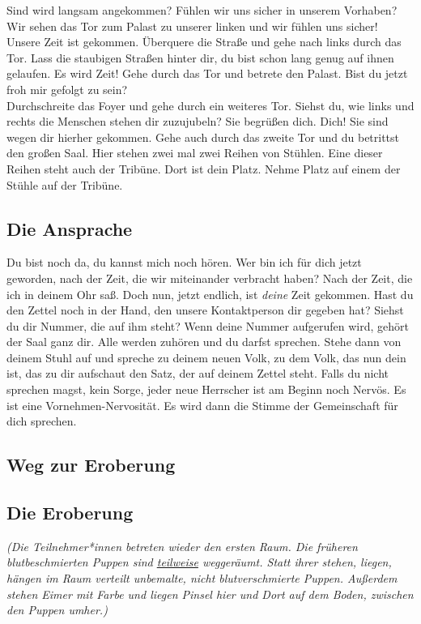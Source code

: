 \documentclass[a4paper, 12pt]{report}
\begin{document}
Sind wird langsam angekommen? 
Fühlen wir uns sicher in unserem Vorhaben?
Wir sehen das Tor zum Palast zu unserer linken und wir fühlen uns sicher! 
Unsere Zeit ist gekommen.
Überquere die Straße und gehe nach links durch das Tor. 
Lass die staubigen Straßen hinter dir, du bist schon lang genug auf ihnen gelaufen. 
Es wird Zeit!
Gehe durch das Tor und betrete den Palast.
Bist du jetzt froh mir gefolgt zu sein? \\

Durchschreite das Foyer und gehe durch ein weiteres Tor. 
Siehst du, wie links und rechts die Menschen stehen dir zuzujubeln?
Sie begrüßen dich. Dich! Sie sind wegen dir hierher gekommen.
Gehe auch durch das zweite Tor und du betrittst den großen Saal. 
Hier stehen zwei mal zwei Reihen von Stühlen. 
Eine dieser Reihen steht auch der Tribüne. 
Dort ist dein Platz. 
Nehme Platz auf einem der Stühle auf der Tribüne.

\subsection{Die Ansprache}
Du bist noch da, du kannst mich noch hören.
Wer bin ich für dich jetzt geworden, nach der Zeit, die wir miteinander verbracht haben?
Nach der Zeit, die ich in deinem Ohr saß.
Doch nun, jetzt endlich, ist \textit{deine} Zeit gekommen. 
Hast du den Zettel noch in der Hand, den unsere Kontaktperson dir gegeben hat?
Siehst du dir Nummer, die auf ihm steht?
Wenn deine Nummer aufgerufen wird, gehört der Saal ganz dir.
Alle werden zuhören und du darfst sprechen. 
Stehe dann von deinem Stuhl auf und spreche zu deinem neuen Volk, zu dem Volk, das nun dein ist,
das zu dir aufschaut den Satz, der auf deinem Zettel steht.
Falls du nicht sprechen magst, kein Sorge, jeder neue Herrscher ist am Beginn noch Nervös.
Es ist eine Vornehmen-Nervosität. 
Es wird dann die Stimme der Gemeinschaft für dich sprechen.


\subsection{Weg zur Eroberung}

\subsection{Die Eroberung}
\textit{(Die Teilnehmer*innen betreten wieder den ersten Raum. 
Die früheren blutbeschmierten Puppen sind \hyperref[zahl_der_puppen]{teilweise} weggeräumt.
Statt ihrer stehen, liegen, hängen im Raum verteilt unbemalte, nicht blutverschmierte Puppen.
Außerdem stehen Eimer mit Farbe und liegen Pinsel hier und Dort auf dem Boden, zwischen den Puppen umher.)}\\
\end{document}

